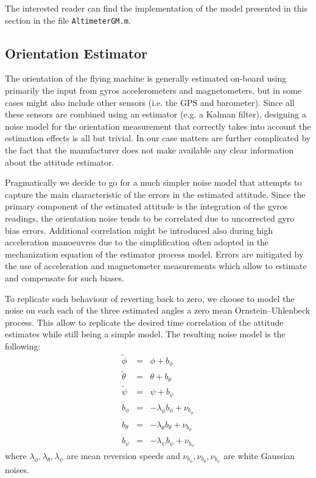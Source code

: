 \documentclass[a4paper,11pt]{report}
\begin{document}
The interested reader can find the implementation of the model presented in this section in the file \texttt{AltimeterGM.m}.  


\subsection{Orientation Estimator}

The orientation of the flying machine is generally estimated on-board using primarily the input from gyros accelerometers and magnetometers, but in some cases might also include  other sensors (i.e. the GPS and barometer). Since all these sensors are combined using an estimator (e.g. a Kalman filter), designing a noise model for the orientation measurement that correctly takes into account the estimation effects is all but trivial. In our case matters are further complicated by the fact that the manufacturer does not make available any clear information about the attitude estimator.
 
Pragmatically we decide to go for a much simpler noise model that attempts to capture the main characteristic of the errors in the estimated attitude. 
Since the primary component of the estimated attitude is the integration of the gyros readings, the orientation noise tends to be correlated due to uncorrected gyro bias errors. 
Additional correlation might be introduced also during high acceleration manoeuvres due to the simplification often adopted in the mechanization equation of the estimator process model.
Errors are mitigated by the use of acceleration and magnetometer measurements which allow to estimate and compensate for such biases.

To replicate such behaviour of reverting back to zero, we choose to model the noise on each each of the three estimated angles a zero mean Ornstein–Uhlenbeck process. This allow to replicate the desired time correlation of the attitude estimates while still being a simple model. The resulting noise model is the following:
\begin{eqnarray}
  \tilde{\phi} &=& \phi + b_\phi\\
  \tilde{\theta} &=& \theta + b_\theta\\
  \tilde{\psi} &=& \psi + b_\psi \\
  \dot{b}_\phi &= &  - \lambda_\phi b_\phi + \nu_{b_\phi}\\
  \dot{b}_\theta &= &  - \lambda_\theta b_\theta + \nu_{b_\theta}\\
  \dot{b}_\psi &= &  - \lambda_\psi b_\psi + \nu_{b_\psi}
\end{eqnarray}
where $\lambda_\phi,\lambda_\theta,\lambda_\psi$ are mean reversion speeds and  $\nu_{b_\phi},\nu_{b_\theta},\nu_{b_\psi}$ are white Gaussian noises.
\end{document}
